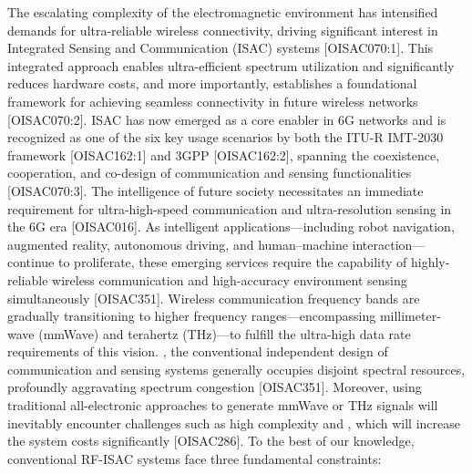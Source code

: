 \markdownRendererDocumentBegin
\markdownRendererSectionBegin
{}\markdownRendererInterblockSeparator
{}\markdownRendererSectionBegin
{}\markdownRendererInterblockSeparator
{}The escalating complexity of the electromagnetic environment has intensified demands for ultra-reliable wireless connectivity, driving significant interest in Integrated Sensing and Communication (ISAC) systems [O\markdownRendererUnderscore{}ISAC\markdownRendererUnderscore{}070:1]. This integrated approach enables ultra-efficient spectrum utilization and significantly reduces hardware costs, and more importantly, establishes a foundational framework for achieving seamless connectivity in future wireless networks [O\markdownRendererUnderscore{}ISAC\markdownRendererUnderscore{}070:2]. ISAC has now emerged as a core enabler in 6G networks and is recognized as one of the six key usage scenarios by both the ITU-R IMT-2030 framework [O\markdownRendererUnderscore{}ISAC\markdownRendererUnderscore{}162:1] and 3GPP [O\markdownRendererUnderscore{}ISAC\markdownRendererUnderscore{}162:2], spanning the coexistence, cooperation, and co-design of communication and sensing functionalities [O\markdownRendererUnderscore{}ISAC\markdownRendererUnderscore{}070:3].\markdownRendererParagraphSeparator
{}The intelligence of future society necessitates an immediate requirement for ultra-high-speed communication and ultra-resolution sensing in the 6G era [O\markdownRendererUnderscore{}ISAC\markdownRendererUnderscore{}016]. As intelligent applications—including robot navigation, augmented reality, autonomous driving, and human–machine interaction—continue to proliferate, these emerging services require the capability of highly-reliable wireless communication and high-accuracy environment sensing simultaneously [O\markdownRendererUnderscore{}ISAC\markdownRendererUnderscore{}351]. Wireless communication frequency bands are gradually transitioning to higher frequency ranges—encompassing millimeter-wave (mmWave) and terahertz (THz)—to fulfill the ultra-high data rate requirements of this vision. , the conventional independent design of communication and sensing systems generally occupies disjoint spectral resources, profoundly aggravating spectrum congestion [O\markdownRendererUnderscore{}ISAC\markdownRendererUnderscore{}351]. Moreover, using traditional all-electronic approaches to generate mmWave or THz signals will inevitably encounter challenges such as high complexity and , which will increase the system costs significantly [O\markdownRendererUnderscore{}ISAC\markdownRendererUnderscore{}286]. To the best of our knowledge, conventional RF-ISAC systems face three fundamental constraints:\markdownRendererInterblockSeparator
